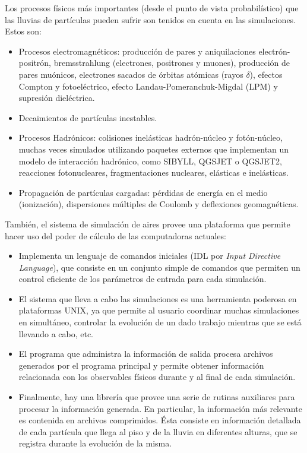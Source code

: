 	Los procesos físicos m\'as importantes (desde el punto de vista probabilístico) que las lluvias de part\'iculas pueden sufrir son tenidos en cuenta en las simulaciones. 
	Estos son:

	\begin{itemize}
	\item Procesos electromagnéticos: producci\'on de pares y aniquilaciones electr\'on-positr\'on, bremsstrahlung (electrones, positrones y muones), producci\'on de pares mu\'onicos, electrones sacados de \'orbitas at\'omicas (rayos $\delta$), efectos Compton y fotoel\'ectrico, efecto Landau-Pomeranchuk-Migdal (LPM) y supresi\'on diel\'ectrica.
	\item Decaimientos de part\'iculas inestables.
	\item Procesos Hadr\'onicos: colisiones inel\'asticas hadr\'on-n\'ucleo y fot\'on-n\'ucleo, muchas veces simulados utilizando paquetes externos que implementan un modelo de interacci\'on hadr\'onico, como SIBYLL, QGSJET o QGSJET2, reacciones fotonucleares, fragmentaciones nucleares, elásticas e inelásticas.
	\item Propagaci\'on de part\'iculas cargadas: pérdidas de energ\'ia en el medio (ionizaci\'on), dispersiones múltiples de Coulomb y deflexiones geomagn\'eticas.
	\end{itemize}    

	Tambi\'en, el sistema de simulación de {\sc aires} provee una plataforma que permite hacer uso del poder de c\'alculo de las computadoras actuales:
	
	\begin{itemize}
	\item Implementa un lenguaje de comandos iniciales (IDL por {\em Input Directive Language}), que consiste en un conjunto simple de comandos que permiten un control eficiente de los par\'ametros de entrada para cada simulación. 
	\item El sistema que lleva a cabo las simulaciones es una herramienta poderosa en plataformas UNIX, ya que permite al usuario coordinar muchas simulaciones en simultáneo, controlar la evolución de un dado trabajo mientras que se está llevando a cabo, etc.
	\item El programa que administra la información de salida procesa archivos generados por el programa principal y permite obtener información relacionada con los observables físicos durante y al final de cada simulación.
	\item Finalmente, hay una librería que provee una serie de rutinas auxiliares para procesar la información generada. En particular, la información m\'as relevante es contenida en archivos comprimidos. \'Esta consiste en informaci\'on detallada de cada part\'icula que llega al piso y de la lluvia en diferentes alturas, que se registra durante la evolución de la misma.
	\end{itemize}
	
